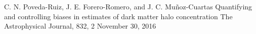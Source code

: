 


\begin{cventries}


\cventry
{C. N. Poveda-Ruiz, J. E. Forero-Romero, and J. C. Muñoz-Cuartas} %
{Quantifying and controlling biases in estimates of dark matter halo concentration} %
{The Astrophysical Journal, 832, 2} %
{November 30, 2016} %
{} %
\vspace{-0.5cm}
\end{cventries}
